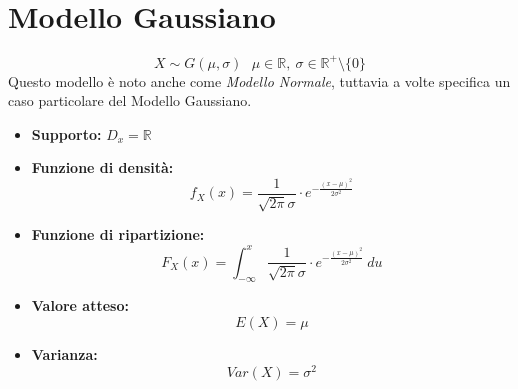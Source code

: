 \documentclass[11pt]{report}
\begin{document}
\section{Modello Gaussiano}
\begin{equation}
    X\sim G(\mu,\sigma)\ \ \ \mu\in\mathbb{R},\ \sigma\in\mathbb{R}^+\setminus\{0\}
\end{equation}
Questo modello è noto anche come \textit{Modello Normale}, tuttavia a volte specifica un caso particolare del Modello Gaussiano.
\begin{itemize}
	\item \textbf{Supporto:} $D_x=\mathbb{R}$
    \item \textbf{Funzione di densità:}
    \begin{equation}
        f_X(x) = \frac{1}{\sqrt{2\pi}\sigma} \cdot e^{-\frac{(x-\mu)^2}{2\sigma^2}}
    \end{equation}
    \item \textbf{Funzione di ripartizione:}
    \begin{equation}
        F_X(x) = \int_{-\infty}^x \frac{1}{\sqrt{2\pi}\sigma} \cdot e^{-\frac{(x-\mu)^2}{2\sigma^2}}\ du
    \end{equation}
    \item \textbf{Valore atteso:}
    \begin{equation}
        E(X) = \mu
    \end{equation}
    \item \textbf{Varianza:}
    \begin{equation}
        Var(X) = \sigma^2
    \end{equation}
\end{itemize}
\begin{center}
    
\end{center}
\begin{center}
    
\end{center}
\end{document}
